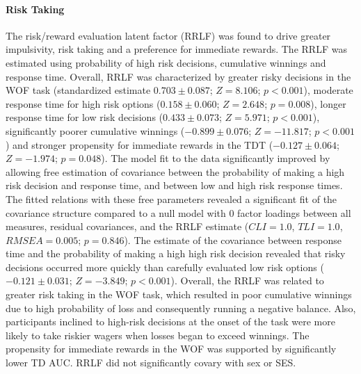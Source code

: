 \documentclass[utf8]{frontiersSCNS} %
\begin{document}
\paragraph{Risk Taking} The risk/reward evaluation latent factor (RRLF) was found to drive greater impulsivity, risk taking and a preference for immediate rewards. The RRLF was estimated using probability of high risk decisions, cumulative winnings and response time. Overall, RRLF was characterized by greater risky decisions in the WOF task (standardized estimate $0.703\pm0.087$; $Z=8.106$; $p<0.001$), moderate response time for high risk options ($0.158\pm0.060$; $Z=2.648$; $p=0.008$), longer response time for low risk decisions ($0.433\pm0.073$; $Z=5.971$; $p<0.001$), significantly poorer cumulative winnings ($-0.899\pm0.076$; $Z=-11.817$; $p<0.001$) and stronger propensity for immediate rewards in the TDT ($-0.127\pm0.064$; $Z=-1.974$; $p=0.048$). The model fit to the data significantly improved by allowing free estimation of covariance between the probability of making a high risk decision and response time, and between low and high risk response times. The fitted relations with these free parameters revealed a significant fit of the covariance structure compared to a null model with 0 factor loadings between all measures, residual covariances, and the RRLF estimate ($CLI = 1.0$, $TLI = 1.0$, $RMSEA = 0.005$; $p = 0.846$). The estimate of the covariance between response time and the probability of making a high high risk decision revealed that risky decisions occurred more quickly than carefully evaluated low risk options ($-0.121\pm0.031$; $Z=-3.849$; $p<0.001$). Overall, the RRLF was related to greater risk taking in the WOF task, which resulted in poor cumulative winnings due to high probability of loss and consequently running a negative balance. Also, participants inclined to high-risk decisions at the onset of the task were more likely to take riskier wagers when losses began to exceed winnings. The propensity for immediate rewards in the WOF was supported by significantly lower TD AUC. RRLF did not significantly covary with sex or SES.
\end{document}
